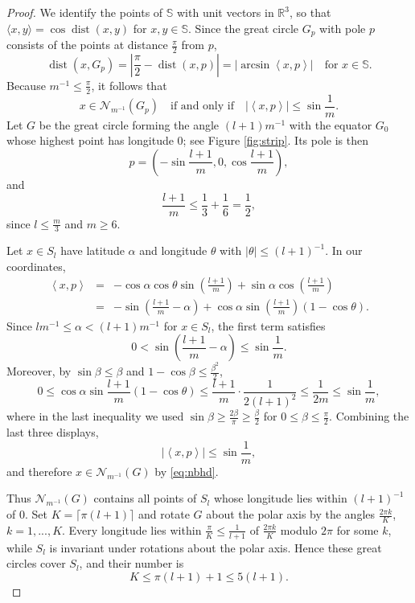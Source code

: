 \documentclass[10pt,a4paper]{amsart}
\newcommand{\Nc}{\mathcal{N}}
\newcommand{\R}{\mathbb{R}}
\newcommand{\Sb}{\mathbb{S}}
\DeclareMathOperator{\dist}{dist}
\begin{document}
\begin{proof}
We identify the points of $\Sb$ with unit vectors in $\R^3$, so that $\langle x,y\rangle=\cos\dist(x,y)$ for $x,y\in\Sb$. Since the great circle $G_p$ with pole $p$ consists of the points at distance $\frac\pi2$ from $p$,
$$\dist\left(x,G_p\right)=\left|\frac\pi2-\dist(x,p)\right|=\left|\arcsin\left\langle x,p\right\rangle\right|\quad\text{for }x\in\Sb.$$
Because $m^{-1}\le\frac\pi2$, it follows that
\begin{equation}\label{eq:nbhd}
x\in\Nc_{m^{-1}}\left(G_p\right)\quad\text{if and only if}\quad\left|\left\langle x,p\right\rangle\right|\le\sin\frac1m.
\end{equation}
Let $G$ be the great circle forming the angle $(l+1)m^{-1}$ with the equator $G_0$ whose highest point has longitude $0$; see Figure \ref{fig:strip}. Its pole is then
$$p=\left(-\sin\frac{l+1}{m},0,\cos\frac{l+1}{m}\right),$$
and
$$\frac{l+1}{m}\le\frac13+\frac16=\frac12,$$
since $l\le\frac m3$ and $m\ge6$.

Let $x\in S_l$ have latitude $\alpha$ and longitude $\theta$ with $|\theta|\le(l+1)^{-1}$. In our coordinates,
\begin{eqnarray*}
\left\langle x,p\right\rangle&=&-\cos\alpha\cos\theta\sin\left(\frac{l+1}{m}\right)+\sin\alpha\cos\left(\frac{l+1}{m}\right)\\
&=&-\sin\left(\frac{l+1}{m}-\alpha\right)+\cos\alpha\sin\left(\frac{l+1}{m}\right)\left(1-\cos\theta\right).
\end{eqnarray*}
Since $lm^{-1}\le\alpha<(l+1)m^{-1}$ for $x\in S_l$, the first term satisfies
$$0<\sin\left(\frac{l+1}{m}-\alpha\right)\le\sin\frac1m.$$
Moreover, by $\sin\beta\le\beta$ and $1-\cos\beta\le\frac{\beta^2}{2}$,
$$0\le\cos\alpha\sin\frac{l+1}{m}\left(1-\cos\theta\right)\le\frac{l+1}{m}\cdot\frac{1}{2(l+1)^2}\le\frac{1}{2m}\le\sin\frac1m,$$
where in the last inequality we used $\sin\beta\ge\frac{2\beta}{\pi}\ge\frac\beta2$ for $0\le\beta\le\frac\pi2$. Combining the last three displays,
$$\left|\left\langle x,p\right\rangle\right|\le\sin\frac1m,$$
and therefore $x\in\Nc_{m^{-1}}(G)$ by \eqref{eq:nbhd}.

Thus $\Nc_{m^{-1}}(G)$ contains all points of $S_l$ whose longitude lies within $(l+1)^{-1}$ of $0$. Set $K=\lceil\pi(l+1)\rceil$ and rotate $G$ about the polar axis by the angles $\frac{2\pi k}{K}$, $k=1,...,K$. Every longitude lies within $\frac\pi K\le\frac{1}{l+1}$ of $\frac{2\pi k}{K}$ modulo $2\pi$ for some $k$, while $S_l$ is invariant under rotations about the polar axis. Hence these great circles cover $S_l$, and their number is
$$K\le\pi(l+1)+1\le5(l+1).$$
\end{proof}
\end{document}
